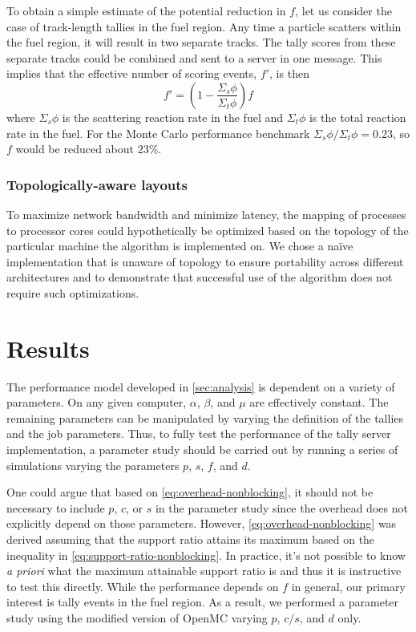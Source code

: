 \documentclass[3p]{elsarticle}
\begin{document}
To obtain a simple estimate of the potential reduction in $f$, let us consider
the case of track-length tallies in the fuel region. Any time a particle
scatters within the fuel region, it will result in two separate tracks. The
tally scores from these separate tracks could be combined and sent to a server
in one message. This implies that the effective number of scoring events, $f'$,
is then
\begin{equation}
  f' = \left ( 1 - \frac{\Sigma_s \phi}{\Sigma_t \phi} \right ) f
\end{equation}
where $\Sigma_s \phi$ is the scattering reaction rate in the fuel and $\Sigma_t
\phi$ is the total reaction rate in the fuel. For the Monte Carlo performance
benchmark $\Sigma_s \phi/\Sigma_t \phi = 0.23$, so $f$ would be reduced about
23\%.

\subsubsection{Topologically-aware layouts}

To maximize network bandwidth and minimize latency, the mapping of processes to
processor cores could hypothetically be optimized based on the topology of the
particular machine the algorithm is implemented on. We chose a naïve
implementation that is unaware of topology to ensure portability across
different architectures and to demonstrate that successful use of the algorithm
does not require such optimizations.

\section{Results}
\label{sec:results}

The performance model developed in \autoref{sec:analysis} is dependent on a
variety of parameters. On any given computer, $\alpha$, $\beta$, and $\mu$ are
effectively constant. The remaining parameters can be manipulated by varying the
definition of the tallies and the job parameters. Thus, to fully test the
performance of the tally server implementation, a parameter study should be
carried out by running a series of simulations varying the parameters $p$, $s$,
$f$, and $d$.

One could argue that based on \eqref{eq:overhead-nonblocking}, it should not be
necessary to include $p$, $c$, or $s$ in the parameter study since the overhead
does not explicitly depend on those parameters. However,
\eqref{eq:overhead-nonblocking} was derived assuming that the support ratio
attains its maximum based on the inequality in
\eqref{eq:support-ratio-nonblocking}. In practice, it's not possible to know
\emph{a priori} what the maximum attainable support ratio is and thus it is
instructive to test this directly. While the performance depends on $f$ in
general, our primary interest is tally events in the fuel region. As a result,
we performed a parameter study using the modified version of OpenMC varying $p$,
$c/s$, and $d$ only.
\end{document}
